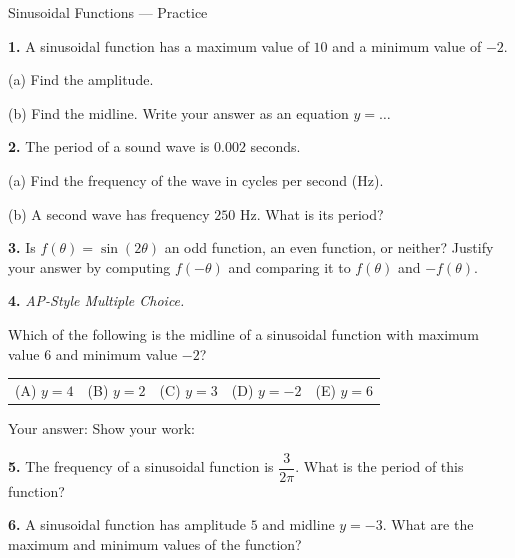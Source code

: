 \documentclass[10pt]{article}
\begin{document}
\namedateperiod

\vspace{0.12in}

\begin{notesbox}{Sinusoidal Functions --- Practice}

\textbf{1.} A sinusoidal function has a maximum value of $10$ and a minimum value
of $-2$.

\medskip
(a) Find the amplitude. 

(b) Find the midline.  Write your answer as an equation $y = \ldots$ 

\vspace{0.08in}

\textbf{2.} The period of a sound wave is $0.002$ seconds.

\medskip
(a) Find the frequency of the wave in cycles per second (Hz). 

(b) A second wave has frequency $250$ Hz.  What is its period? 

\vspace{0.08in}

\textbf{3.} Is $f(\theta) = \sin(2\theta)$ an odd function, an even function, or
neither?  Justify your answer by computing $f(-\theta)$ and comparing it to
$f(\theta)$ and $-f(\theta)$.


\vspace{0.08in}

\textbf{4.} \textit{AP-Style Multiple Choice.}

Which of the following is the midline of a sinusoidal function with maximum
value $6$ and minimum value $-2$?

\medskip
\begin{tabular}{@{}lllll@{}}
(A) $y = 4$ \quad & (B) $y = 2$ \quad & (C) $y = 3$ \quad & (D) $y = -2$ \quad & (E) $y = 6$
\end{tabular}

\vspace{0.08in}
Your answer: \blank{1.5cm} \quad Show your work:


\vspace{0.08in}

\textbf{5.} The frequency of a sinusoidal function is $\dfrac{3}{2\pi}$.
What is the period of this function?


\vspace{0.08in}

\textbf{6.} A sinusoidal function has amplitude $5$ and midline $y = -3$.
What are the maximum and minimum values of the function?


\end{notesbox}
\end{document}
